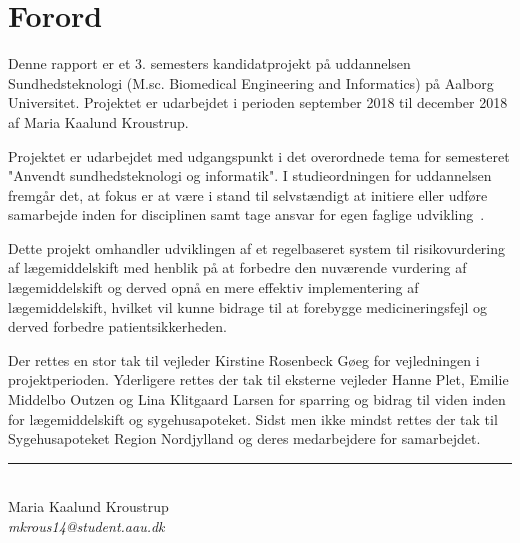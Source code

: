 \chapter*{Forord}
Denne rapport er et 3. semesters kandidatprojekt på uddannelsen Sundhedsteknologi (M.sc. Biomedical Engineering and Informatics) på Aalborg Universitet. Projektet er udarbejdet i perioden september 2018 til december 2018 af Maria Kaalund Kroustrup. 

Projektet er udarbejdet med udgangspunkt i det overordnede tema for semesteret "Anvendt sundhedsteknologi og informatik". I studieordningen for uddannelsen fremgår det, at fokus er at være i stand til selvstændigt at initiere eller udføre samarbejde inden for disciplinen samt tage ansvar for egen faglige udvikling~\citep{Studieordning2011}. 

Dette projekt omhandler udviklingen af et regelbaseret system til risikovurdering af lægemiddelskift med henblik på at forbedre den nuværende vurdering af lægemiddelskift og derved opnå en mere effektiv implementering af lægemiddelskift, hvilket vil kunne bidrage til at forebygge medicineringsfejl og derved forbedre patientsikkerheden. 

Der rettes en stor tak til vejleder Kirstine Rosenbeck Gøeg for vejledningen i projektperioden. Yderligere rettes der tak til eksterne vejleder Hanne Plet, Emilie Middelbo Outzen og Lina Klitgaard Larsen for sparring og bidrag til viden inden for lægemiddelskift og sygehusapoteket. Sidst men ikke mindst rettes der tak til Sygehusapoteket Region Nordjylland og deres medarbejdere for samarbejdet. 

\vspace{1.5cm}
\begin{center}
\rule{6cm}{0.4pt} \\ \vspace{0.2cm}
Maria Kaalund Kroustrup \\
\textit{mkrous14@student.aau.dk}
\end{center}